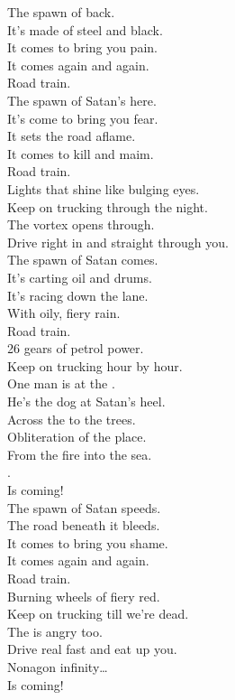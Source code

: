 


The spawn of  back. \\
It's made of steel and black. \\
It comes to bring you pain. \\
It comes again and again. \\
Road train. \\

The spawn of Satan's here. \\
It's come to bring you fear. \\
It sets the road aflame. \\
It comes to kill and maim. \\
Road train. \\

Lights that shine like bulging eyes. \\
Keep on trucking through the night. \\
The vortex opens through. \\
Drive right in and straight through you. \\

The spawn of Satan comes. \\
It's carting oil and drums. \\
It's racing down the lane. \\
With oily, fiery rain. \\
Road train. \\

26 gears of petrol power. \\
Keep on trucking hour by hour. \\
One man is at the . \\
He's the dog at Satan's heel. \\

Across the  to the trees. \\
Obliteration of the place. \\
From the fire into the sea. \\
. \\
Is coming! \\

The spawn of Satan speeds. \\
The road beneath it bleeds. \\
It comes to bring you shame. \\
It comes again and again. \\
Road train. \\

Burning wheels of fiery red. \\
Keep on trucking till we're dead. \\
The  is angry too. \\
Drive real fast and eat up you. \\

Nonagon infinity… \\
Is coming! \\
